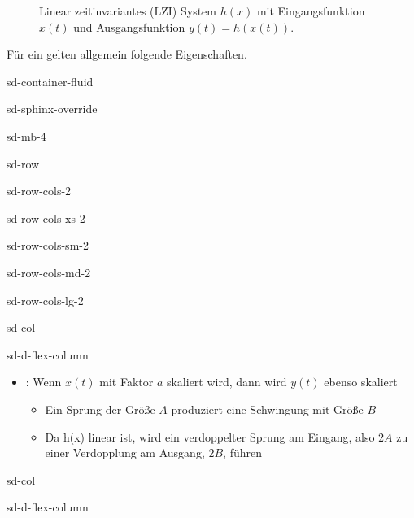 \documentclass[letterpaper,10pt,english]{jupyterBook}
\let\sphinxpxdimen\pdfpxdimen\else\newdimen\sphinxpxdimen
\begin{document}
\begin{figure}[htbp]
\centering
\capstart

\noindent\sphinxincludegraphics[width=400\sphinxpxdimen]{{LTI}.jpg}
\caption{Linear zeitinvariantes (LZI) System \(h(x)\) mit Eingangsfunktion \(x(t)\) und Ausgangsfunktion \(y(t) = h(x(t))\).}\label{\detokenize{content/5_LTI:lti}}\end{figure}

\sphinxAtStartPar
Für ein  gelten allgemein folgende Eigenschaften.

\begin{sphinxuseclass}{sd-container-fluid}
\begin{sphinxuseclass}{sd-sphinx-override}
\begin{sphinxuseclass}{sd-mb-4}
\begin{sphinxuseclass}{sd-row}
\begin{sphinxuseclass}{sd-row-cols-2}
\begin{sphinxuseclass}{sd-row-cols-xs-2}
\begin{sphinxuseclass}{sd-row-cols-sm-2}
\begin{sphinxuseclass}{sd-row-cols-md-2}
\begin{sphinxuseclass}{sd-row-cols-lg-2}
\begin{sphinxuseclass}{sd-col}
\begin{sphinxuseclass}{sd-d-flex-column}\begin{itemize}
\item {} 
\sphinxAtStartPar
{}: Wenn \(x(t)\) mit Faktor \(a\) skaliert wird, dann wird \(y(t)\) ebenso skaliert
\begin{itemize}
\item {} 
\sphinxAtStartPar
Ein Sprung der Größe \(A\) produziert eine Schwingung mit Größe \(B\)

\item {} 
\sphinxAtStartPar
Da h(x) linear ist, wird ein verdoppelter Sprung am Eingang, also \(2A\) zu einer Verdopplung am Ausgang, \(2B\), führen

\end{itemize}

\end{itemize}

\end{sphinxuseclass}
\end{sphinxuseclass}
\begin{sphinxuseclass}{sd-col}
\begin{sphinxuseclass}{sd-d-flex-column}
\begin{figure}[htbp]
\centering
\capstart


\end{figure}
\end{sphinxuseclass}
\end{sphinxuseclass}
\end{sphinxuseclass}
\end{sphinxuseclass}
\end{sphinxuseclass}
\end{sphinxuseclass}
\end{sphinxuseclass}
\end{sphinxuseclass}
\end{sphinxuseclass}
\end{sphinxuseclass}
\end{sphinxuseclass}
\end{document}

